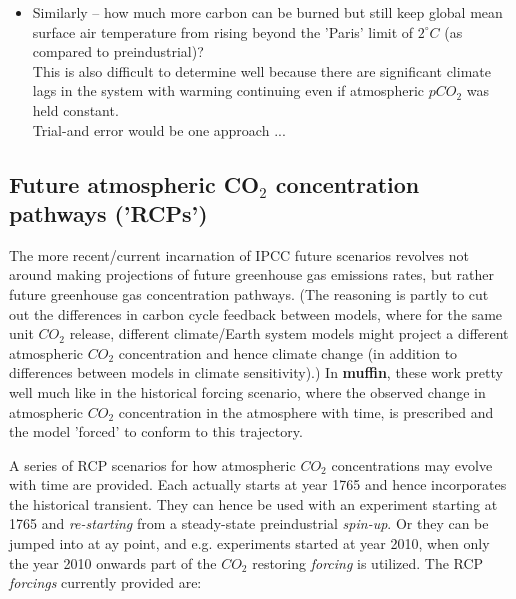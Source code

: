 \begin{itemize}[noitemsep]
\vspace{1mm}
\item Similarly -- how much more carbon can be burned but still keep global mean surface air temperature from rising beyond the 'Paris' limit of \(2^{\circ}C\) (as compared to preindustrial)?
\\This is also difficult to determine well because there are significant climate lags in the system with warming continuing even if atmospheric \(pCO_{2}\) was held constant.
\\Trial-and error would be one approach ...

\end{itemize}


\subsection{Future atmospheric CO$_{2}$ concentration pathways ('RCPs')}

The more recent/current incarnation of IPCC future scenarios revolves not around  making projections of future greenhouse gas emissions rates, but rather future greenhouse gas concentration pathways. (The reasoning is partly to cut out the differences in carbon cycle feedback between models, where for the same unit \(CO_{2}\) release, different climate/Earth system models might project a different atmospheric \(CO_{2}\) concentration and hence climate change (in addition to differences between models in climate sensitivity).) In \textbf{muffin}, these work pretty well much like in the historical forcing scenario, where the observed change in atmospheric \(CO_{2}\) concentration in the atmosphere with time, is prescribed and the model 'forced' to conform to this trajectory.

\vspace{1mm}

A series of RCP scenarios for how atmospheric \(CO_{2}\) concentrations may evolve with time are provided. Each actually starts at year 1765 and hence incorporates the historical transient. They can hence be used with an experiment starting at 1765 and \textit{re-starting} from a steady-state preindustrial \textit{spin-up}. Or they can be jumped into at ay point, and e.g. experiments started at year 2010, when only the year 2010 onwards part of the \(CO_{2}\) restoring \textit{forcing} is utilized. The RCP \textit{forcings} currently provided are:

